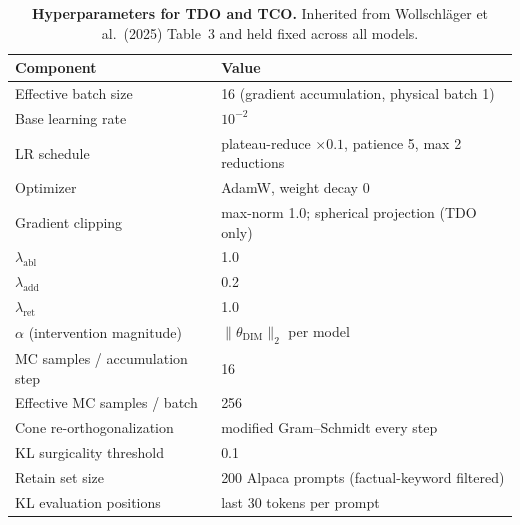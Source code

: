 \begin{table}[t]
\centering
\caption{%
\textbf{Hyperparameters for TDO and TCO.} Inherited from
Wollschläger et al.~(2025) Table~3 and held fixed across all models.}
\label{tab:hyperparams}
\small
\begin{tabular}{ll}
\toprule
Component & Value \\
\midrule
Effective batch size            & 16 (gradient accumulation, physical batch 1) \\
Base learning rate              & $10^{-2}$ \\
LR schedule                     & plateau-reduce $\times 0.1$, patience 5, max 2 reductions \\
Optimizer                       & AdamW, weight decay 0 \\
Gradient clipping               & max-norm 1.0; spherical projection (TDO only) \\
$\lambda_{\text{abl}}$          & 1.0 \\
$\lambda_{\text{add}}$          & 0.2 \\
$\lambda_{\text{ret}}$          & 1.0 \\
$\alpha$ (intervention magnitude) & $\|\theta_{\text{DIM}}\|_{2}$ per model \\
MC samples / accumulation step  & 16 \\
Effective MC samples / batch    & 256 \\
Cone re-orthogonalization       & modified Gram--Schmidt every step \\
KL surgicality threshold        & 0.1 \\
Retain set size                 & 200 Alpaca prompts (factual-keyword filtered) \\
KL evaluation positions         & last 30 tokens per prompt \\
\bottomrule
\end{tabular}
\end{table}
